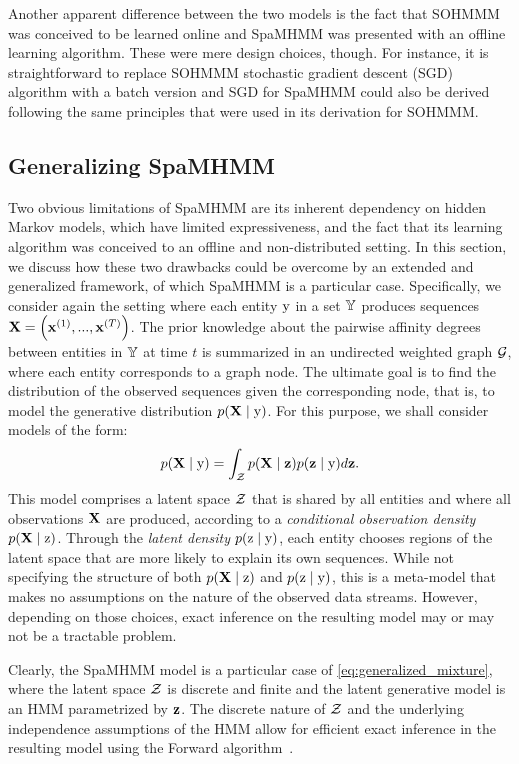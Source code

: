 Another apparent difference between the two models is the fact that SOHMMM was conceived to be learned online and SpaMHMM was presented with an offline learning algorithm. These were mere design choices, though. For instance, it is straightforward to replace SOHMMM stochastic gradient descent (SGD) algorithm with a batch version and SGD for SpaMHMM could also be derived following the same principles that were used in its derivation for SOHMMM.

\subsection{Generalizing SpaMHMM}

Two obvious limitations of SpaMHMM are its inherent dependency on hidden Markov models, which have limited expressiveness, and the fact that its learning algorithm was conceived to an offline and non-distributed setting. In this section, we discuss how these two drawbacks could be overcome by an extended and generalized framework, of which SpaMHMM is a particular case. Specifically, we consider again the setting where each entity ${\textnormal{y}}$ in a set ${\mathbb{Y}}$ produces sequences ${\mathbf{X}} = \left({\mathbf{x}}^{(1)}, ...,{\mathbf{x}}^{(T)} \right)$. The prior knowledge about the pairwise affinity degrees between entities in ${\mathbb{Y}}$ at time $t$ is summarized in an undirected weighted graph ${\mathcal{G}}$, where each entity corresponds to a graph node. The ultimate goal is to find the distribution of the observed sequences given the corresponding node, that is, to model the generative distribution $p({\mathbf{X}} \mid {\textnormal{y}})$. For this purpose, we shall consider models of the form:
\begin{equation}
\label{eq:generalized_mixture}
p({\mathbf{X}} \mid {\textnormal{y}}) = \int_{{\mathcal{Z}}} p({\mathbf{X}} \mid {\mathbf{z}}) p({\mathbf{z}} \mid {\textnormal{y}}) d{\mathbf{z}}.
\end{equation}
This model comprises a latent space ${\mathcal{Z}}$ that is shared by all entities and where all observations ${\mathbf{X}}$ are produced, according to a \textit{conditional observation density} $p({\mathbf{X}} \mid {\textnormal{z}})$. Through the \textit{latent density} $p({\textnormal{z}} \mid {\textnormal{y}})$, each entity chooses regions of the latent space that are more likely to explain its own sequences. While not specifying the structure of both $p({\mathbf{X}} \mid {\textnormal{z}})$ and $p({\textnormal{z}} \mid {\textnormal{y}})$, this is a meta-model that makes no assumptions on the nature of the observed data streams. However, depending on those choices, exact inference on the resulting model may or may not be a tractable problem.

Clearly, the SpaMHMM model is a particular case of \eqref{eq:generalized_mixture}, where the latent space ${\mathcal{Z}}$ is discrete and finite and the latent generative model is an HMM parametrized by ${\mathbf{z}}$. The discrete nature of ${\mathcal{Z}}$ and the underlying independence assumptions of the HMM allow for efficient exact inference in the resulting model using the Forward algorithm~\cite{Rabiner1986}.

